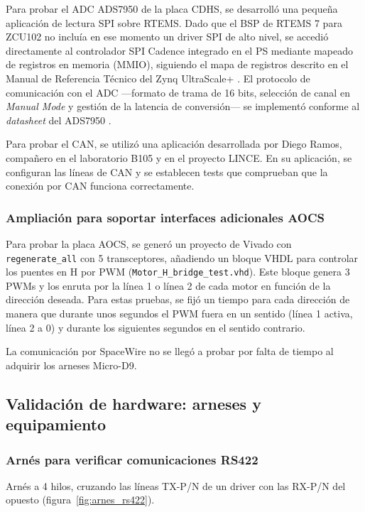 Para probar el ADC ADS7950 de la placa CDHS, se desarrolló una pequeña aplicación de
lectura SPI sobre RTEMS. Dado que el BSP de RTEMS 7 para ZCU102 no incluía en ese
momento un driver SPI de alto nivel, se accedió directamente al controlador SPI Cadence
integrado en el PS mediante mapeado de registros en memoria (MMIO), siguiendo el mapa de
registros descrito en el Manual de Referencia Técnico del Zynq UltraScale+
\cite{xilinx2023ug1085}. El protocolo de comunicación con el ADC ---formato de trama de
16 bits, selección de canal en \textit{Manual Mode} y gestión de la latencia de conversión--- se
implementó conforme al \textit{datasheet} del ADS7950 \cite{ti2018ads7950}.

Para probar el CAN, se utilizó una aplicación desarrollada por Diego Ramos, compañero en
el laboratorio B105 y en el proyecto LINCE. En su aplicación, se configuran las líneas de CAN
y se establecen tests que comprueban que la conexión por CAN funciona correctamente.

\subsubsection{Ampliación para soportar interfaces adicionales AOCS}

Para probar la placa AOCS, se generó un proyecto de Vivado con \texttt{regenerate\_all} con
5 transceptores, añadiendo un bloque VHDL para controlar los puentes en H por PWM
(\texttt{Motor\_H\_bridge\_test.vhd}). Este bloque genera 3 PWMs y los enruta por la línea 1 o
línea 2 de cada motor en función de la dirección deseada. Para estas pruebas, se fijó un
tiempo para cada dirección de manera que durante unos segundos el PWM fuera en un
sentido (línea 1 activa, línea 2 a 0) y durante los siguientes segundos en el sentido contrario.

La comunicación por SpaceWire no se llegó a probar por falta de tiempo al adquirir los
arneses Micro-D9.

\subsection{Validación de hardware: arneses y equipamiento}

\subsubsection{Arnés para verificar comunicaciones RS422}

Arnés a 4 hilos, cruzando las líneas TX-P/N de un driver con las RX-P/N del opuesto
(figura~\ref{fig:arnes_rs422}).

